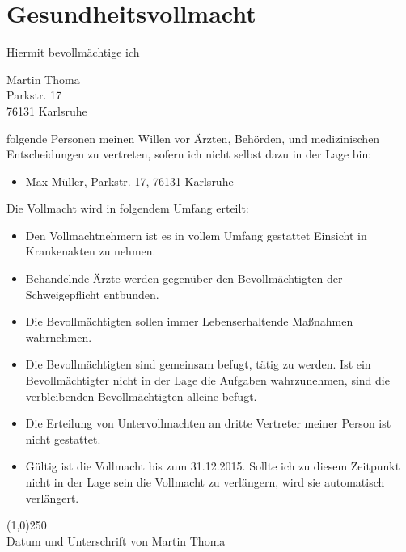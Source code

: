 \documentclass[a4paper]{scrartcl}
\newcommand{\Vollmachtgeber}{Martin Thoma}                          %
\newcommand{\VollmachtgeberAnschrift}{Parkstr. 17}                  %
\newcommand{\VollmachtgeberOrt}{76131 Karlsruhe}                    %
\newcommand{\Vollmachtempfaenger}{Max Müller}                       %
\newcommand{\VollmachtempfaengerAnschrift}{Parkstr. 17}             %
\newcommand{\VollmachtempfaengerOrt}{76131 Karlsruhe}               %
\begin{document}
\section*{Gesundheitsvollmacht}
Hiermit bevollmächtige ich

\Vollmachtgeber\\
\VollmachtgeberAnschrift\\
\VollmachtgeberOrt

folgende Personen meinen Willen vor Ärzten, Behörden, und medizinischen
Entscheidungen zu vertreten, sofern ich nicht selbst dazu in der Lage bin:

\begin{itemize}
  \item \Vollmachtempfaenger, \VollmachtempfaengerAnschrift, \VollmachtempfaengerOrt
\end{itemize}

Die Vollmacht wird in folgendem Umfang erteilt:

\begin{itemize}
  \item Den Vollmachtnehmern ist es in vollem Umfang gestattet Einsicht in
        Krankenakten zu nehmen.
  \item Behandelnde Ärzte werden gegenüber den Bevollmächtigten der
        Schweigepflicht entbunden.
  \item Die Bevollmächtigten sollen immer Lebenserhaltende Maßnahmen wahrnehmen.
  \item Die Bevollmächtigten sind gemeinsam befugt, tätig zu werden. Ist ein
        Bevollmächtigter nicht in der Lage die Aufgaben wahrzunehmen, sind die
        verbleibenden Bevollmächtigten alleine befugt.
  \item Die Erteilung von Untervollmachten an dritte Vertreter meiner Person
        ist nicht gestattet.
  \item Gültig ist die Vollmacht bis zum 31.12.2015. Sollte ich zu diesem
        Zeitpunkt nicht in der Lage sein die Vollmacht zu verlängern, wird sie
        automatisch verlängert.
\end{itemize}

\vspace{1.5cm}
\line(1,0){250}\\
\vspace{-0.3cm}
{\scriptsize Datum und Unterschrift von \Vollmachtgeber}\\
\end{document}
